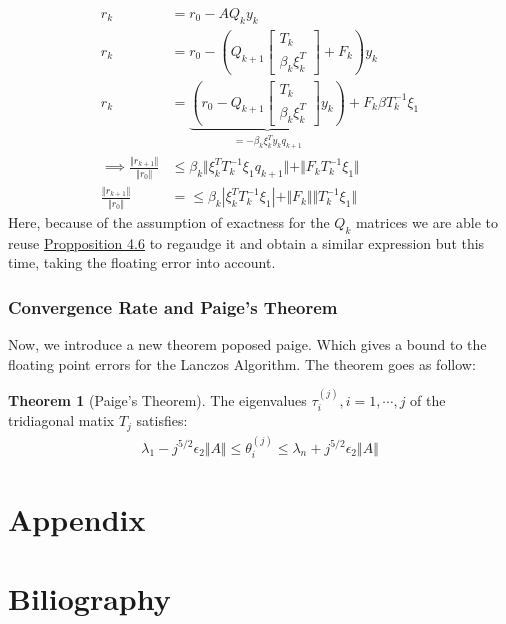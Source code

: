 \documentclass[]{article}
\theoremstyle{definition}
\newtheorem{theorem}{Theorem}            %
\begin{document}
            \begin{align}
                r_k &= r_0 - AQ_ky_k
                \\
                r_k &= r_0 - 
                    \left(
                        Q_{k + 1} \begin{bmatrix}
                            T_k
                            \\
                            \beta_k \xi_k^T
                        \end{bmatrix}
                        + 
                        F_k
                    \right)
                y_k
                \\
                r_k &= 
                \underbrace{\left(
                    r_0 - Q_{k + 1}\begin{bmatrix}
                        T_k
                        \\
                        \beta_k \xi_k^T
                    \end{bmatrix}y_k
                \right)}_{= -\beta_k\xi_k^Ty_kq_{k + 1}} + F_k \beta T_k^{-1}\xi_1
                \\
                \implies
                \frac{\Vert r_{k + 1}\Vert}
                {
                    \Vert r_0\Vert
                } &\le
                \beta_k \Vert
                    \xi_k^T T_k^{-1}\xi_1 q_{k + 1}
                \Vert + 
                \Vert F_kT_k^{-1}\xi_1 \Vert
                \\
                \frac{\Vert r_{k + 1}\Vert}
                {
                    \Vert r_0\Vert
                } &= 
                \le 
                \beta_k |
                    \xi_k^T T_k^{-1}\xi_1
                | + 
                \Vert F_k\Vert  \Vert T_k^{-1}\xi_1\Vert
            \end{align}
            Here, because of the assumption of exactness for the $Q_k$ matrices we are able to reuse \hyperref[prop:Lanczos_Vectors_and_Residuals]{Propposition 4.6} to regaudge it and obtain a similar expression but this time, taking the floating error into account. 
        
        \subsubsection{Convergence Rate and Paige's Theorem}
            Now, we introduce a new theorem poposed paige. Which gives a bound to the floating point errors for the Lanczos Algorithm. The theorem goes as follow: 
            \begin{theorem}[Paige's Theorem]
                The eigenvalues $\tau_i^{(j)}, i = 1, \cdots, j$ of the tridiagonal matix $T_j$ satisfies: 
                \begin{align}
                    \lambda_1 - j^{5/2}\epsilon_2\Vert A\Vert 
                    \le \theta_i^{(j)}
                    \le 
                    \lambda_n + j^{5/2}\epsilon_2\Vert A\Vert
                \end{align}
            \end{theorem}
            
        
\section{Appendix}
\newpage
\section{Biliography}
            
            
\end{document}
